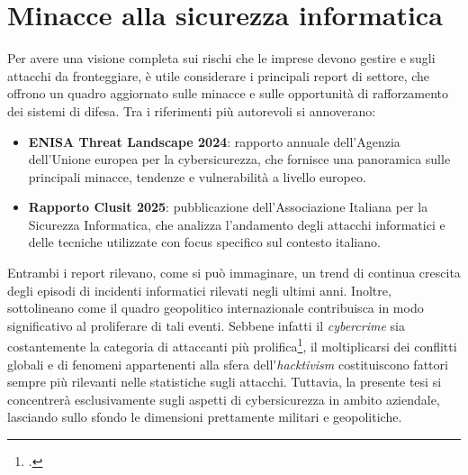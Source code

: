\section{Minacce alla sicurezza informatica}
Per avere una visione completa sui rischi che le imprese devono gestire e sugli attacchi da fronteggiare,
è utile considerare i principali report di settore, che offrono un quadro aggiornato sulle minacce e sulle
opportunità di rafforzamento dei sistemi di difesa. Tra i riferimenti più autorevoli si annoverano:
\begin{itemize}
    \item \textbf{ENISA Threat Landscape 2024}: rapporto annuale dell'Agenzia dell'Unione europea per la 
        cybersicurezza, che fornisce una panoramica sulle principali minacce, tendenze e vulnerabilità
        a livello europeo.
    \item \textbf{Rapporto Clusit 2025}: pubblicazione dell’Associazione Italiana per la Sicurezza 
        Informatica, che analizza l’andamento degli attacchi informatici e delle tecniche utilizzate
        con focus specifico sul contesto italiano.
\end{itemize}

Entrambi i report rilevano, come si può immaginare, un trend di continua crescita degli episodi di
incidenti informatici rilevati negli ultimi anni.
Inoltre, sottolineano come il quadro geopolitico internazionale contribuisca in modo significativo 
al proliferare di tali eventi. 
Sebbene infatti il \textit{cybercrime} sia costantemente la categoria di attaccanti più prolifica\footcite[p. 22]{clusit-report},
il moltiplicarsi dei conflitti globali e di fenomeni appartenenti alla sfera
dell’\textit{hacktivism} costituiscono fattori sempre più rilevanti nelle statistiche sugli attacchi. 
Tuttavia, la presente tesi si concentrerà esclusivamente sugli aspetti di cybersicurezza in ambito aziendale, 
lasciando sullo sfondo le dimensioni prettamente militari e geopolitiche.

